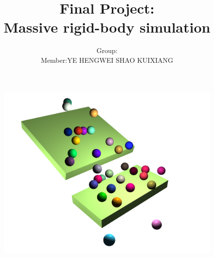 \documentclass[acmtog]{acmart}
\title{Final Project:\\ {Massive rigid-body simulation}}
\author{Group:\quad 27 \\ Member:\quad YE HENGWEI \quad SHAO KUIXIANG  }
\begin{document}
\maketitle
\Large
\vspace*{2 ex}
\begin{figure}[htb]
	\includegraphics[width=\linewidth]{banner.png}
\end{figure}
\end{document}

